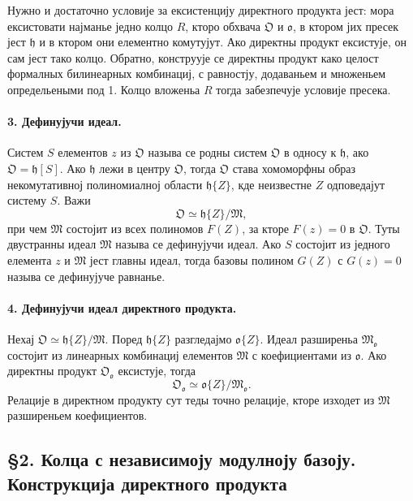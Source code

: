 ﻿\documentclass[11pt]{article}
\begin{document}
Нужно и достаточно условије за ексистенцију директного продукта јест: мора ексистовати најманье једно колцо \(R\), кторо обхвача \(\mathfrak O\) и \(\mathfrak o\), в ктором јих пресек јест \(\mathfrak h\) и в ктором они елементно комутујут. Ако директны продукт ексистује, он сам јест тако колцо. Обратно, конструује се директны продукт како целост формалных билинеарных комбинациј, с равностју, додаваньем и множеньем определьеными под 1. Колцо вложеньа \(R\) тогда забезпечује условије пресека.

\paragraph{3. Дефинујучи идеал.}
Систем \(S\) елементов \(z\) из \(\mathfrak O\) называ се родны систем \(\mathfrak O\) в односу к \(\mathfrak h\), ако \(\mathfrak O=\mathfrak h[S]\). Ако \(\mathfrak h\) лежи в центру \(\mathfrak O\), тогда \(\mathfrak O\) става хомоморфны образ некомутативној полиномиалној области \(\mathfrak h\{Z\}\), кде неизвестне \(Z\) одповедајут систему \(S\). Важи
\[
        \mathfrak O\simeq \mathfrak h\{Z\}/\mathfrak M,
\]
при чем \(\mathfrak M\) состојит из всех полиномов \(F(Z)\), за кторе \(F(z)=0\) в \(\mathfrak O\). Туты двустранны идеал \(\mathfrak M\) называ се дефинујучи идеал. Ако \(S\) состојит из једного елемента \(z\) и \(\mathfrak M\) јест главны идеал, тогда базовы полином \(G(Z)\) с \(G(z)=0\) называ се дефинујуче равнанье.

\paragraph{4. Дефинујучи идеал директного продукта.}
Нехај \(\mathfrak O\simeq\mathfrak h\{Z\}/\mathfrak M\). Поред \(\mathfrak h\{Z\}\) разгледајмо \(\mathfrak o\{Z\}\). Идеал разширеньа \(\mathfrak M_{\mathfrak o}\) состојит из линеарных комбинациј елементов \(\mathfrak M\) с коефициентами из \(\mathfrak o\). Ако директны продукт \(\mathfrak O_{\mathfrak o}\) ексистује, тогда
\[
        \mathfrak O_{\mathfrak o}\simeq \mathfrak o\{Z\}/\mathfrak M_{\mathfrak o}.
\]
Релације в директном продукту сут теды точно релације, кторе изходет из \(\mathfrak M\) разширеньем коефициентов.

\subsection*{§2. Колца с независимоју модулноју базоју. Конструкција директного продукта}
\end{document}
